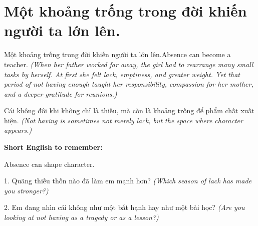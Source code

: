 \section{Một khoảng trống trong đời khiến người ta lớn lên.}
\begin{truyen}{Một khoảng trống trong đời khiến người ta lớn lên.}{Absence can become a teacher.}
\textit{(When her father worked far away, the girl had to rearrange many small tasks by herself. At first she felt lack, emptiness, and greater weight. Yet that period of not having enough taught her responsibility, compassion for her mother, and a deeper gratitude for reunions.)}
\end{truyen}
\begin{baihoc}
Cái không đôi khi không chỉ là thiếu, mà còn là khoảng trống để phẩm chất xuất hiện.
\textit{(Not having is sometimes not merely lack, but the space where character appears.)}
\end{baihoc}
\begin{ghinhoanh}
\textbf{Short English to remember:}

Absence can shape character.
\end{ghinhoanh}
\begin{tuhocnhanh}
1. Quãng thiếu thốn nào đã làm em mạnh hơn? \textit{(Which season of lack has made you stronger?)}

2. Em đang nhìn cái không như một bất hạnh hay như một bài học? \textit{(Are you looking at not having as a tragedy or as a lesson?)}
\end{tuhocnhanh}
\ngancach
